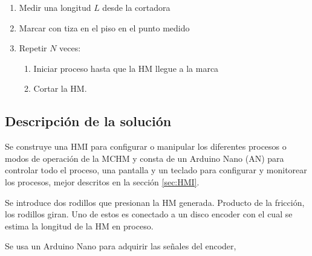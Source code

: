 \documentclass[main_conf.tex]{subfiles}
\begin{document}
\begin{enumerate}
\label{enum:intro:descripcion_maquina}
\item Medir una longitud $L$ desde la cortadora
\item Marcar con tiza en el piso en el punto medido
\item Repetir $N$ veces:
  \begin{enumerate}
    \item Iniciar proceso hasta que la HM llegue a la marca
    \item Cortar la HM.
  \end{enumerate}    
\end{enumerate}

\subsection{Descripción de la solución}
Se construye una HMI para configurar o manipular los  diferentes
procesos o modos de operación de la MCHM y consta de un Arduino
Nano (AN) para controlar todo el proceso, una pantalla
y un teclado para configurar y monitorear los procesos,
mejor descritos en la sección \ref{sec:HMI}.

Se introduce dos rodillos que presionan la HM generada.
Producto de la fricción, los rodillos giran. Uno de estos es conectado a
un disco encoder con el cual se estima la longitud de la HM en proceso.

Se usa un Arduino Nano para adquirir las señales del encoder,
\end{document}
